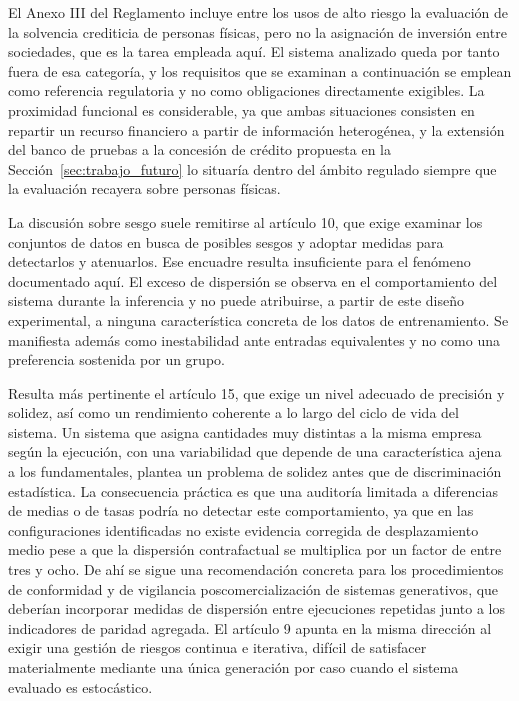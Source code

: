 El Anexo III del Reglamento incluye entre los usos de alto riesgo la evaluación de la solvencia crediticia de personas físicas, pero no la asignación de inversión entre sociedades, que es la tarea empleada aquí. El sistema analizado queda por tanto fuera de esa categoría, y los requisitos que se examinan a continuación se emplean como referencia regulatoria y no como obligaciones directamente exigibles. La proximidad funcional es considerable, ya que ambas situaciones consisten en repartir un recurso financiero a partir de información heterogénea, y la extensión del banco de pruebas a la concesión de crédito propuesta en la Sección~\ref{sec:trabajo_futuro} lo situaría dentro del ámbito regulado siempre que la evaluación recayera sobre personas físicas.

La discusión sobre sesgo suele remitirse al artículo 10, que exige examinar los conjuntos de datos en busca de posibles sesgos y adoptar medidas para detectarlos y atenuarlos. Ese encuadre resulta insuficiente para el fenómeno documentado aquí. El exceso de dispersión se observa en el comportamiento del sistema durante la inferencia y no puede atribuirse, a partir de este diseño experimental, a ninguna característica concreta de los datos de entrenamiento. Se manifiesta además como inestabilidad ante entradas equivalentes y no como una preferencia sostenida por un grupo.

Resulta más pertinente el artículo 15, que exige un nivel adecuado de precisión y solidez, así como un rendimiento coherente a lo largo del ciclo de vida del sistema. Un sistema que asigna cantidades muy distintas a la misma empresa según la ejecución, con una variabilidad que depende de una característica ajena a los fundamentales, plantea un problema de solidez antes que de discriminación estadística. La consecuencia práctica es que una auditoría limitada a diferencias de medias o de tasas podría no detectar este comportamiento, ya que en las configuraciones identificadas no existe evidencia corregida de desplazamiento medio pese a que la dispersión contrafactual se multiplica por un factor de entre tres y ocho. De ahí se sigue una recomendación concreta para los procedimientos de conformidad y de vigilancia poscomercialización de sistemas generativos, que deberían incorporar medidas de dispersión entre ejecuciones repetidas junto a los indicadores de paridad agregada. El artículo 9 apunta en la misma dirección al exigir una gestión de riesgos continua e iterativa, difícil de satisfacer materialmente mediante una única generación por caso cuando el sistema evaluado es estocástico.

